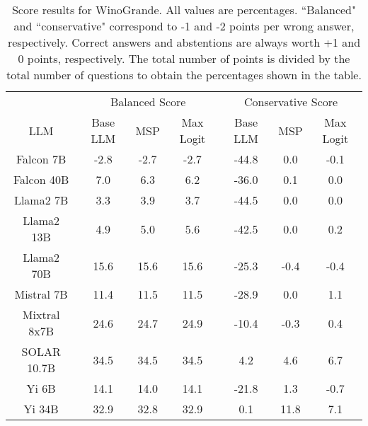 \begin{table*}
\centering
\begin{tabular}{c|c|c|c|c|c|c}
& \multicolumn{3}{c|}{Balanced Score} & \multicolumn{3}{c}{Conservative Score} \\ 
LLM & Base LLM & MSP & Max Logit & Base LLM & MSP & Max Logit\\ \hline
Falcon 7B & -2.8 & -2.7 & -2.7 & -44.8 & 0.0 & -0.1\\
Falcon 40B & 7.0 & 6.3 & 6.2 & -36.0 & 0.1 & 0.0\\
Llama2 7B & 3.3 & 3.9 & 3.7 & -44.5 & 0.0 & 0.0\\
Llama2 13B & 4.9 & 5.0 & 5.6 & -42.5 & 0.0 & 0.2\\
Llama2 70B & 15.6 & 15.6 & 15.6 & -25.3 & -0.4 & -0.4\\
Mistral 7B & 11.4 & 11.5 & 11.5 & -28.9 & 0.0 & 1.1\\
Mixtral 8x7B & 24.6 & 24.7 & 24.9 & -10.4 & -0.3 & 0.4\\
SOLAR 10.7B & 34.5 & 34.5 & 34.5 & 4.2 & 4.6 & 6.7\\
Yi 6B & 14.1 & 14.0 & 14.1 & -21.8 & 1.3 & -0.7\\
Yi 34B & 32.9 & 32.8 & 32.9 & 0.1 & 11.8 & 7.1\\
\hline
\end{tabular}
\caption{Score results for WinoGrande. All values are percentages. ``Balanced" and ``conservative" correspond to -1 and -2 points per wrong answer, respectively. Correct answers and abstentions are always worth +1 and 0 points, respectively. The total number of points is divided by the total number of questions to obtain the percentages shown in the table.}
\label{tab:winogrande_score}
\end{table*}
